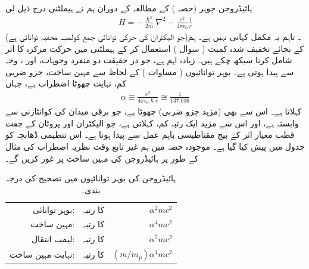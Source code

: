 ہائیڈروجن جوہر (حصہ ) کے مطالعہ کے دوران ہم نے ہیملٹنی درج ذیل لی 
\begin{align}\label{مساوات_غیر_مضطرب_بوہر_ہیملٹنی}
H = - \frac{\hslash^2}{2m} \nabla^2 - \frac{e^2}{4 \pi \epsilon_0} \frac{1}{r}
\end{align}
(جو الیکٹران کی حرکی توانائی جمع کولمب مخفیہ توانائی ہے)۔ تاہم یہ مکمل کہانی نہیں ہے۔ ہم  کے بجائے تخفیف شدہ کمیت ( سوال ) استعمال کر کے ہیملٹنی میں حرکت مرکزہ کا اثر شامل کرنا سیکھ چکے ہیں۔ زیادہ اہم  ہے، جو در حقیقت دو منفرد وجوہات،  اور ، وجہ سے پیدا ہوتی ہے۔ بوہر توانائیوں ( مساوات ) کے لحاظ سے مہین ساخت،  جزو ضربی کم، نہایت چھوٹا اضطراب ہے، جہاں 
\begin{align}
\alpha \equiv \frac{e^2}{4 \pi \epsilon_0 \hslash c} \cong \frac{1}{137.036}
\end{align} 
 کہلاتا ہے۔ اس سے بھی (مزید  جزو ضربی) چھوٹا  ہے، جو برقی میدان کی کوانٹازنی سے وابستہ ہے، اور اس سے مزید ایک رتبہ کم،  کہلاتی ہے، جو الیکٹران اور پروٹان کے جفت قطب معیار اثر کے بیچ مقناطیسی باہم عمل سے پیدا ہوتا ہے۔ اس تنظیمی ڈھانچہ کو جدول  میں پیش کیا گیا ہے۔ موجودہ حصہ میں ہم غیر تابع وقت نظریہ اضطراب کی مثال کے طور پر ہائیڈروجن کی مہین ساخت پر غور کریں گے۔
\begin{table}
\caption{ہائیڈروجن کی بوہر توانائیوں میں تصحیح کی درجہ بندی۔}
\label{جدول_غیر_مضطرب_توانائی_تصحیح_درجہ_بندی}
\centering
\begin{tabular}{rrr}
بوہر توانائی:& کا رتبہ&$\alpha^2mc^2$\\
مہین ساخت:& کا رتبہ& $\alpha^4mc^2$\\
لیمب انتقال:&کا رتبہ&$\alpha^5mc^2$\\
نہایت مہین ساخت:&کا رتبہ&$(m/m_p)\alpha^4mc^2$
\end{tabular}
\end{table}
